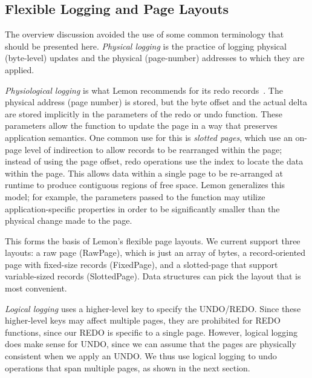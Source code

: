 \documentclass[letterpaper,twocolumn,english]{article}
\newcommand{\yad}{Lemon\xspace}
\begin{document}
%


\subsection{Flexible Logging and Page Layouts}
\label{flex-logging}
\label{page-layouts}

The overview discussion avoided the use of some common terminology 
that should be presented here. {\em Physical logging } 
is the practice of logging physical (byte-level) updates
and the physical (page-number) addresses to which they are applied.

{\em Physiological logging } is what \yad recommends for its redo
records~\cite{physiological}. The physical address (page number) is
stored, but the byte offset and the actual delta are stored implicitly
in the parameters of the redo or undo function. These parameters allow
the function to update the page in a way that preserves application
semantics.  One common use for this is {\em slotted pages}, which use
an on-page level of indirection to allow records to be rearranged
within the page; instead of using the page offset, redo operations use
the index to locate the data within the page. This allows data within a single
page to be re-arranged at runtime to produce contiguous regions of
free space. \yad generalizes this model; for example, the parameters
passed to the function may utilize application-specific properties in
order to be significantly smaller than the physical change made to the
page.

This forms the basis of \yad's flexible page layouts.  We current
support three layouts: a raw page (RawPage), which is just an array of
bytes, a record-oriented page with fixed-size records (FixedPage), and
a slotted-page that support variable-sized records (SlottedPage).
Data structures can pick the layout that is most convenient.

{\em Logical logging} uses a higher-level key to specify the
UNDO/REDO.  Since these higher-level keys may affect multiple pages,
they are prohibited for REDO functions, since our REDO is specific to
a single page.  However, logical logging does make sense for UNDO,
since we can assume that the pages are physically consistent when we
apply an UNDO.  We thus use logical logging to undo operations that
span multiple pages, as shown in the next section.
\end{document}
